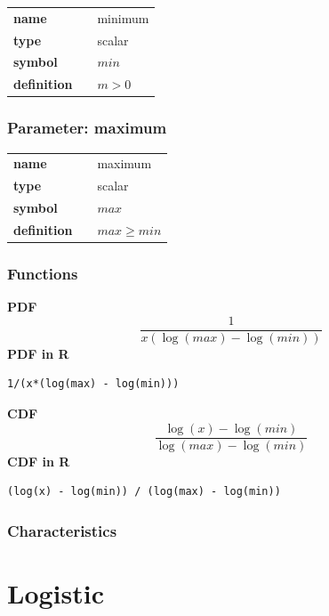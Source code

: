\noindent\begin{tabular}{p{2cm}cl}
\textbf{name} & & minimum \\
\textbf{type} & & scalar \\
\textbf{symbol} & & $min$  \\
\textbf{definition} & & $m>0$
\end{tabular}
\subsubsection*{Parameter: maximum}

\noindent\begin{tabular}{p{2cm}cl}
\textbf{name} & & maximum \\
\textbf{type} & & scalar \\
\textbf{symbol} & & $max$  \\
\textbf{definition} & & $max \geq min$
\end{tabular}
\subsubsection*{Functions}

\smallskip \noindent \hspace{.2cm} \textbf{PDF} 
\begin{equation*}\frac{1}{x(\log(max) - \log(min))}\end{equation*}
\smallskip \noindent \hspace{.2cm} \textbf{PDF in R}  
\begin{verbatim}1/(x*(log(max) - log(min)))\end{verbatim}
\smallskip \noindent \hspace{.2cm} \textbf{CDF} 
\begin{equation*}\frac{\log(x) - \log(min)}{\log(max) - \log(min)}\end{equation*}
\smallskip \noindent \hspace{.2cm} \textbf{CDF in R} 
\begin{verbatim}(log(x) - log(min)) / (log(max) - log(min))\end{verbatim}
\smallskip
\subsubsection*{Characteristics}
\smallskip
\section*{Logistic} 

